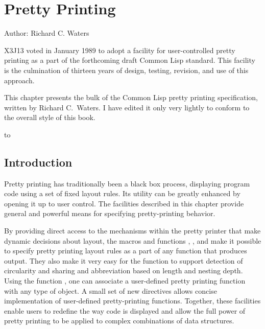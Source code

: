 

\clearpage\def\pagestatus{FINAL PROOF}

\chapter{Pretty Printing}
\label{PPRINT}

Author: Richard C. Waters

\prefaceword
\begin{new}
X3J13 voted in January 1989
to adopt a facility for user-controlled pretty printing
as a part of the forthcoming draft Common Lisp standard.
This facility is the culmination of thirteen
years of design, testing, revision, and use of this approach.
\end{new}

This chapter presents the bulk of the Common Lisp
pretty printing specification, written by Richard C.~Waters.  I have
edited it only very lightly
to conform to the overall style of this book.

\noindent\hbox to \textwidth{\hss---Guy L. Steele Jr.}

\section{Introduction}

Pretty printing has traditionally been a black box process, displaying
program code using a set of fixed layout rules.  Its utility can be greatly
enhanced by opening it up to user control.  The facilities described
in this chapter provide general and powerful means for specifying pretty-printing
behavior.

By providing direct access to the mechanisms within the pretty printer that
make dynamic decisions about layout, the macros and functions
, , and  make
it possible to specify pretty printing layout rules as a part of any
function that produces output.  They also make it very easy for the
function to support
detection of circularity and sharing and abbreviation based on length and
nesting depth.  Using the function
, one can associate a user-defined pretty
printing function with any type of object.  A small set of new 
directives allows concise implementation of user-defined pretty-printing
functions.
Together, these facilities
enable users to redefine the way code is displayed and allow the full power
of pretty printing to be applied to complex combinations of data
structures.

